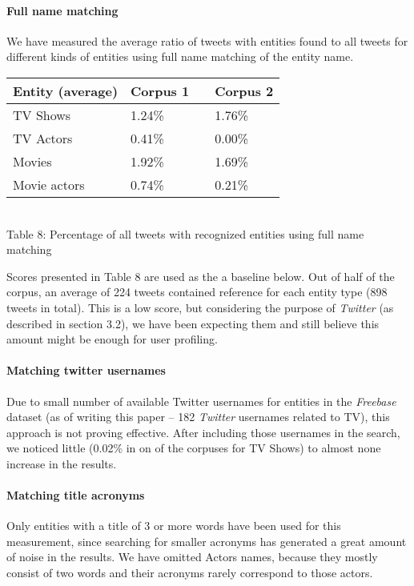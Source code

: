 \paragraph{Full name matching}
We have measured the average ratio of tweets with entities found to all tweets for different kinds of entities using full name matching of the entity name.

\begin{center}
  \begin{tabular}{ | p{4cm} | p{2cm} | p{1cm}| p{2cm} | } \hline
    Entity (average) & Corpus 1 & & Corpus 2 \\ \hline
    TV Shows & 1.24\% & & 1.76\% \\ \hline
    TV Actors & 0.41\% & & 0.00\% \\ \hline
    Movies & 1.92\% & & 1.69\% \\ \hline
    Movie actors & 0.74\% & & 0.21\% \\ \hline
  \end{tabular} \\
  Table 8: Percentage of all tweets with recognized entities using full name matching \\
\end{center}

Scores presented in Table 8 are used as the a baseline below. Out of half of the corpus, an average of 224 tweets contained reference for each entity type (898 tweets in total). This is a low score, but considering the purpose of \textit{Twitter} (as described in section 3.2), we have been expecting them and still believe this amount might be enough for user profiling.

\paragraph{Matching twitter usernames}
Due to small number of available Twitter usernames for entities in the \textit{Freebase} dataset (as of writing this paper -- 182 \textit{Twitter} usernames related to TV), this approach is not proving effective. After including those usernames in the search,
we noticed little (0.02\% in on of the corpuses for TV Shows) to almost none increase in the results.

\paragraph{Matching title acronyms}
Only entities with a title of 3 or more words have been used for this measurement, since searching
for smaller acronyms has generated a great amount of noise in the results. We have omitted Actors names, because
they mostly consist of two words and their acronyms rarely correspond to those actors.

